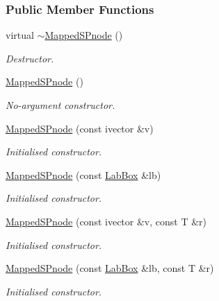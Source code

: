 \subsubsection*{\-Public \-Member \-Functions}
\begin{DoxyCompactItemize}
\item 
virtual \hyperlink{classsubpavings_1_1MappedSPnode_a8f23f414976c6bc3409de02288496e04}{$\sim$\-Mapped\-S\-Pnode} ()
\begin{DoxyCompactList}\small\item\em \-Destructor. \end{DoxyCompactList}\item 
\hyperlink{classsubpavings_1_1MappedSPnode_acc4eb13ea772050e37b1eae2e560b117}{\-Mapped\-S\-Pnode} ()
\begin{DoxyCompactList}\small\item\em \-No-\/argument constructor. \end{DoxyCompactList}\item 
\hyperlink{classsubpavings_1_1MappedSPnode_a5c67c4c7aec0a3ce461b7ac459ad70c2}{\-Mapped\-S\-Pnode} (const ivector \&v)
\begin{DoxyCompactList}\small\item\em \-Initialised constructor. \end{DoxyCompactList}\item 
\hyperlink{classsubpavings_1_1MappedSPnode_a866ab9d7d7e517e5c403588f12d8e919}{\-Mapped\-S\-Pnode} (const \hyperlink{classLabBox}{\-Lab\-Box} \&lb)
\begin{DoxyCompactList}\small\item\em \-Initialised constructor. \end{DoxyCompactList}\item 
\hyperlink{classsubpavings_1_1MappedSPnode_afe15c759857516d725298a1392ab6f07}{\-Mapped\-S\-Pnode} (const ivector \&v, const \-T \&r)
\begin{DoxyCompactList}\small\item\em \-Initialised constructor. \end{DoxyCompactList}\item 
\hyperlink{classsubpavings_1_1MappedSPnode_a5911cc25e5152fe9cced953de14707e7}{\-Mapped\-S\-Pnode} (const \hyperlink{classLabBox}{\-Lab\-Box} \&lb, const \-T \&r)
\begin{DoxyCompactList}\small\item\em \-Initialised constructor. \end{DoxyCompactList}\item 

\end{DoxyCompactItemize}
